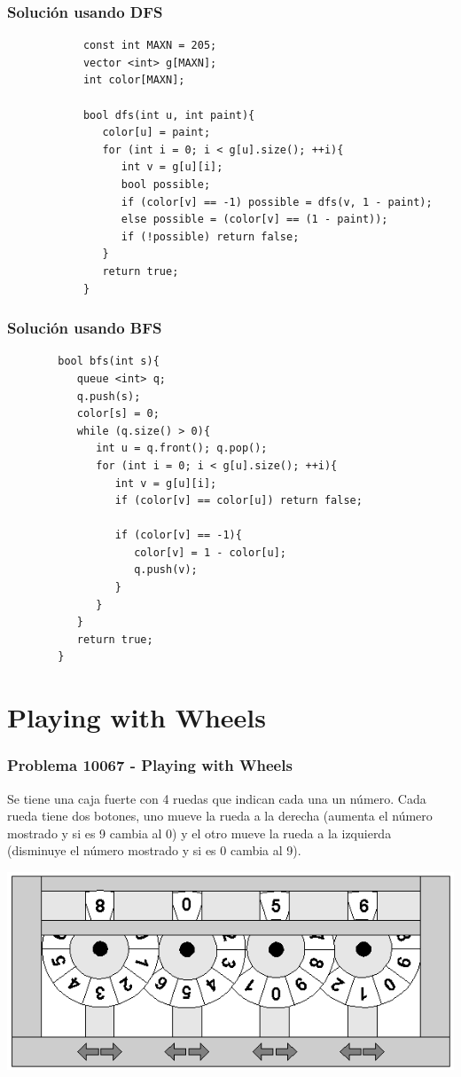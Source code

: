 \documentclass{beamer}
\begin{document}
	\begin{frame}[fragile]
		\frametitle{Solución usando DFS}
		\begin{lstlisting}
			const int MAXN = 205;
			vector <int> g[MAXN];
			int color[MAXN];

			bool dfs(int u, int paint){
			   color[u] = paint;
			   for (int i = 0; i < g[u].size(); ++i){
			      int v = g[u][i];
			      bool possible;
			      if (color[v] == -1) possible = dfs(v, 1 - paint);
			      else possible = (color[v] == (1 - paint));
			      if (!possible) return false;
			   }
			   return true;
			}
		\end{lstlisting}
	\end{frame}
	
	\begin{frame}[fragile]
		\frametitle{Solución usando BFS}
		\begin{lstlisting}
		bool bfs(int s){
		   queue <int> q;
		   q.push(s);
		   color[s] = 0;
		   while (q.size() > 0){
		      int u = q.front(); q.pop();
		      for (int i = 0; i < g[u].size(); ++i){
		         int v = g[u][i];
		         if (color[v] == color[u]) return false;

		         if (color[v] == -1){
		            color[v] = 1 - color[u];
		            q.push(v);
		         }
		      }
		   }
		   return true;
		}
		\end{lstlisting}
	\end{frame}
	

\section{Playing with Wheels}
	\begin{frame}
		\frametitle{Problema 10067 - Playing with Wheels}
		Se tiene una caja fuerte con 4 ruedas que indican cada una un número. Cada rueda tiene dos botones, uno mueve la rueda a la derecha (aumenta el número mostrado y si es 9 cambia al 0) y el otro mueve la rueda a la izquierda (disminuye el número mostrado y si es 0 cambia al 9).
		\begin{center} \includegraphics[height = 0.4\textheight]{wheels.png} \end{center}
	\end{frame}
	
\end{document}
